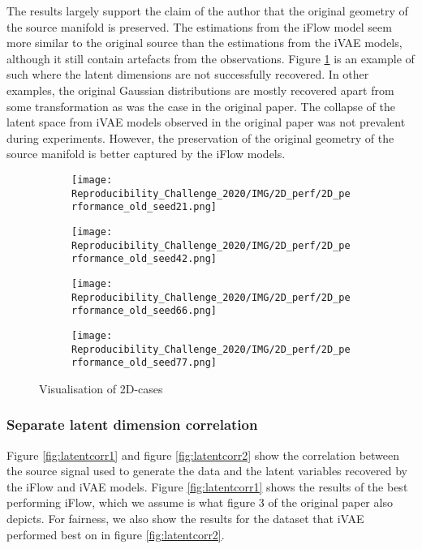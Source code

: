 The results largely support the claim of the author that the original geometry of the source manifold is preserved. The estimations from the iFlow model seem more similar to the original source than the estimations from the iVAE models, although it still contain artefacts from the observations. Figure \ref{fig:2D:a} is an example of such where the latent dimensions are not successfully recovered. In other examples, the original Gaussian distributions are mostly recovered apart from some transformation as was the case in the original paper. The collapse of the latent space from iVAE models observed in the original paper was not prevalent during experiments. However, the preservation of the original geometry of the source manifold is better captured by the iFlow models.

\begin{figure}[ht]
    \centering
  \begin{subfigure}[b]{0.4\textwidth}
    \centering
    \texttt{[image: Reproducibility\_Challenge\_2020/IMG/2D\_perf/2D\_performance\_old\_seed21.png]}
    \caption{}
    \label{fig:2D:a}
  \end{subfigure}%
  \begin{subfigure}[b]{0.4\textwidth}
    \centering
    \texttt{[image: Reproducibility\_Challenge\_2020/IMG/2D\_perf/2D\_performance\_old\_seed42.png]}
    \caption{}
    \label{fig:2D:b}
  \end{subfigure}
  \begin{subfigure}[b]{0.4\textwidth}
    \centering
    \texttt{[image: Reproducibility\_Challenge\_2020/IMG/2D\_perf/2D\_performance\_old\_seed66.png]}
    \caption{}
    \label{fig:2D:c}
  \end{subfigure}%
  \begin{subfigure}[b]{0.4\textwidth}
    \centering
    \texttt{[image: Reproducibility\_Challenge\_2020/IMG/2D\_perf/2D\_performance\_old\_seed77.png]}
    \caption{}
    \label{fig:2D:d}
  \end{subfigure}
  \caption{Visualisation of 2D-cases}
  \label{fig:2D}
\end{figure}

\subsubsection{Separate latent dimension correlation}
\label{sec:latentcorr}
Figure \ref{fig:latentcorr1} and figure \ref{fig:latentcorr2} show the correlation between the source signal used to generate the data and the latent variables recovered by the iFlow and iVAE models. Figure \ref{fig:latentcorr1} shows the results of the best performing iFlow, which we assume is what figure 3 of the original paper also depicts. For fairness, we also show the results for the dataset that iVAE performed best on in figure \ref{fig:latentcorr2}.

